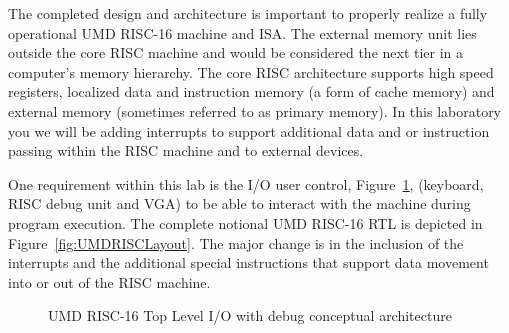 \documentclass{article}
\begin{document}
The completed design and architecture is important to properly realize a fully operational UMD RISC-16 machine and ISA. The external memory unit lies outside the core RISC machine and would be considered the next tier in a computer’s memory hierarchy. The core RISC architecture supports high speed registers, localized data and instruction memory (a form of cache memory) and external memory (sometimes referred to as primary memory). In this laboratory you we will be adding interrupts to support additional data and or instruction passing within the RISC machine and to external devices.

One requirement within this lab is the I/O user control, Figure~\ref{fig:RiscToplevel}, (keyboard, RISC debug unit and VGA) to be able to interact with the machine during program execution. The complete notional UMD RISC-16 RTL is depicted in Figure~\ref{fig:UMDRISCLayout}. The major change is in the inclusion of the interrupts and the additional special instructions that support data movement into or out of the RISC machine.

\begin{figure}[!htbp]
  \centering
  \caption{UMD RISC-16 Top Level I/O with debug conceptual architecture}
  \label{fig:RiscToplevel}
\end{figure}
\FloatBarrier
\end{document}
